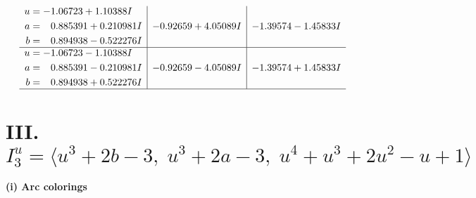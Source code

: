 \documentclass[1p]{elsarticle_modified}
\theoremstyle{definition}
\begin{document}
$$\begin{array}{c|c|c}
\begin{aligned}
u &= -1.06723 + 1.10388 I \\
a &= \phantom{-}0.885391 + 0.210981 I \\
b &= \phantom{-}0.894938 - 0.522276 I\end{aligned}
 & -0.92659 + 4.05089 I & -1.39574 - 1.45833 I \\ \hline\begin{aligned}
u &= -1.06723 - 1.10388 I \\
a &= \phantom{-}0.885391 - 0.210981 I \\
b &= \phantom{-}0.894938 + 0.522276 I\end{aligned}
 & -0.92659 - 4.05089 I & -1.39574 + 1.45833 I\\
 \hline 
 \end{array}$$\newpage\newpage\renewcommand{\arraystretch}{1}
\centering \section*{III. $I^u_{3}= \langle u^3+2 b-3,\;u^3+2 a-3,\;u^4+u^3+2 u^2- u+1 \rangle$}
\flushleft \textbf{(i) Arc colorings}\\
\end{document}
